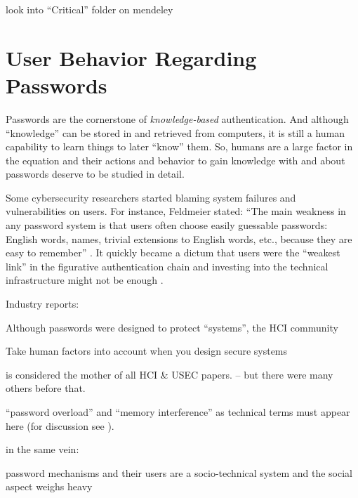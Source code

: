 	look into ``Critical'' folder on mendeley

	
\section{User Behavior Regarding Passwords}\label{sec:rw:user-behavior}
Passwords are the cornerstone of \textit{knowledge-based} authentication. And although ``knowledge'' can be stored in and retrieved from computers, it is still a human capability to learn things to later ``know'' them. So, humans are a large factor in the equation and their actions and behavior to gain knowledge with and about passwords deserve to be studied in detail. 

Some cybersecurity researchers started blaming system failures and vulnerabilities on users. For instance, Feldmeier \etal stated: ``The main weakness in any password system is that users often choose easily guessable passwords: English words, names, trivial extensions to English words, etc., because they are easy to remember'' \cite{Feldmeier1990UnixPasswordSecurity}. It quickly became a dictum that users were the ``weakest link'' in the figurative authentication chain and investing into the technical infrastructure might not be enough \cite{Sasse2001WeakestLink}. 


Industry reports: \cite{CSID2012PasswordHabits}


Although passwords were designed to protect ``systems'', the HCI community


Take human factors into account when you design secure systems \cite{Sasse2005UsableSecurityPosition}


\cite{Adams1999UsersEnemy} is considered the mother of all HCI \& USEC papers. -- but there were many others before that.



``password overload'' and ``memory interference'' as technical terms must appear here (for discussion see \cite{Yang2016MnemonicSentenceBased}).

in the same vein: \cite{Chiasson2009InterferencesGraphical}


password mechanisms and their users are a socio-technical system and the social aspect weighs heavy \cite{Weirich2001PrettyGoodPersuasion}


